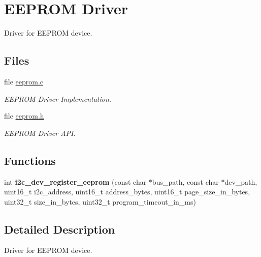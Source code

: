 \hypertarget{group__I2CEEPROM}{}\section{E\+E\+P\+R\+OM Driver}
\label{group__I2CEEPROM}


Driver for E\+E\+P\+R\+OM device.  


\subsection*{Files}
\begin{DoxyCompactItemize}
\item 
file \mbox{\hyperlink{eeprom_8c}{eeprom.\+c}}
\begin{DoxyCompactList}\small\item\em E\+E\+P\+R\+OM Driver Implementation. \end{DoxyCompactList}\item 
file \mbox{\hyperlink{eeprom_8h}{eeprom.\+h}}
\begin{DoxyCompactList}\small\item\em E\+E\+P\+R\+OM Driver A\+PI. \end{DoxyCompactList}\end{DoxyCompactItemize}
\subsection*{Functions}
\begin{DoxyCompactItemize}
\item 
\mbox{\label{group__I2CEEPROM_ga809ef5ca392c60e6c037808888c214a9}} 
int {\bfseries i2c\+\_\+dev\+\_\+register\+\_\+eeprom} (const char $\ast$bus\+\_\+path, const char $\ast$dev\+\_\+path, uint16\+\_\+t i2c\+\_\+address, uint16\+\_\+t address\+\_\+bytes, uint16\+\_\+t page\+\_\+size\+\_\+in\+\_\+bytes, uint32\+\_\+t size\+\_\+in\+\_\+bytes, uint32\+\_\+t program\+\_\+timeout\+\_\+in\+\_\+ms)
\end{DoxyCompactItemize}


\subsection{Detailed Description}
Driver for E\+E\+P\+R\+OM device. 

